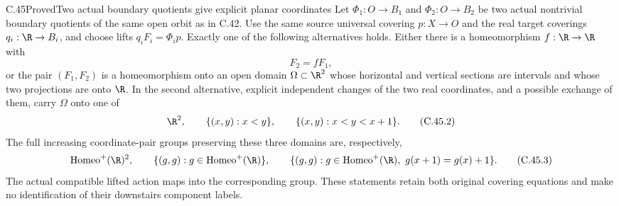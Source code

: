 \begin{claim}{C.45}{Proved}{Two actual boundary quotients give explicit planar coordinates}
Let $\Phi_1:O\to B_1$ and $\Phi_2:O\to B_2$
be two actual nontrivial boundary quotients
of the same open orbit as in C.42.
Use the same source universal covering
$p:X\to O$ and the real target coverings
$q_i:\R\to B_i$, and choose lifts
$q_iF_i=\Phi_i p$.
Exactly one of the following alternatives holds.
Either there is a homeomorphism
$f:\R\to\R$ with
\[
                         F_2=fF_1,                     \tag{C.45.1}
\]
or the pair $(F_1,F_2)$ is a homeomorphism
onto an open domain $\Omega\subset\R^2$
whose horizontal and vertical sections
are intervals and whose two projections
are onto $\R$.
In the second alternative, explicit
independent changes of the two real
coordinates, and a possible exchange
of them, carry $\Omega$ onto one of
\[
 \R^2,\qquad
 \{(x,y):x<y\},\qquad
 \{(x,y):x<y<x+1\}.                                    \tag{C.45.2}
\]
The full increasing coordinate-pair
groups preserving these three domains
are, respectively,
\[
 \operatorname{Homeo}^+(\R)^2,\qquad
 \{(g,g):g\in\operatorname{Homeo}^+(\R)\},\qquad
 \{(g,g):g\in\operatorname{Homeo}^+(\R),\
                         g(x+1)=g(x)+1\}.               \tag{C.45.3}
\]
The actual compatible lifted action
maps into the corresponding group.
These statements retain both original
covering equations and make no
identification of their downstairs
component labels.
\end{claim}

